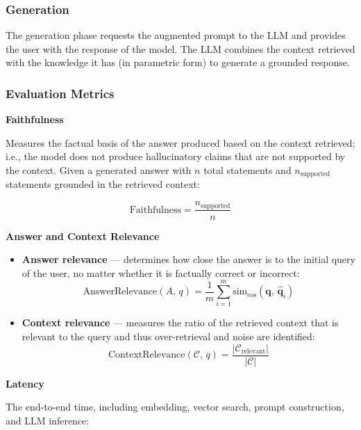 \subsubsection{Generation}

The generation phase requests the augmented prompt to the LLM and provides the user with the response of the model. The LLM combines the context retrieved with the knowledge it has (in parametric form) to generate a grounded response.

\subsubsection{Evaluation Metrics}

\textbf{Faithfulness}

Measures the factual basis of the answer produced based on the context retrieved; i.e., the model does not produce hallucinatory claims that are not supported by the context. Given a generated answer with $n$ total statements and $n_{\text{supported}}$ statements grounded in the retrieved context:

\begin{equation}
    \text{Faithfulness} = \frac{n_{\text{supported}}}{n}
\end{equation}

\textbf{Answer and Context Relevance}
\begin{itemize}
    \item \textbf{Answer relevance} — determines how close the answer is to the initial query of the user, no matter whether it is factually correct or incorrect:
    \begin{equation}
        \text{AnswerRelevance}(A,\, q) = \frac{1}{m} \sum_{i=1}^{m} \text{sim}_{\cos}\!\left(\mathbf{q},\, \hat{\mathbf{q}}_i\right)
    \end{equation}

    \item \textbf{Context relevance} — measures the ratio of the retrieved context that is relevant to the query and thus over-retrieval and noise are identified:
    \begin{equation}
        \text{ContextRelevance}(\mathcal{C},\, q) = \frac{|\mathcal{C}_{\text{relevant}}|}{|\mathcal{C}|}
    \end{equation}
\end{itemize}

\textbf{Latency}

The end-to-end time, including embedding, vector search, prompt construction, and LLM inference:

